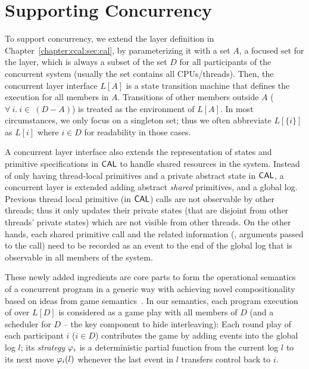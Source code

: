 \section{Supporting Concurrency}
\label{chapter:ccal:sec:ccal-overview}


To support concurrency, 
we extend the layer definition in Chapter~\ref{chapter:ccal:sec:cal},
by parameterizing it with a set $A$, 
a focused set for the layer, which is always a subset of the set $D$ for all participants of the concurrent system (usually the set contains all CPUs/threads).
Then, the concurrent layer interface $L[A]$ is a state transition machine
that defines the execution for all members in $A$. 
Transitions of other members outside $A$  ($\forall \ i . \ i \in\ (D - A)$)
is treated as the environment of $L[A]$. 
In most circumstances, we only focus on a singleton set; 
thus we often abbreviate $L[\{i\}]$ as $L[i]$ where $i\in{}D$ for readability in those cases.

A concurrent layer interface also extends the representation of states and primitive specifications in $\mathsf{CAL}$ to handle shared resources in the system. 
Instead of only having thread-local primitives and a private abstract state in $\mathsf{CAL}$, 
a concurrent layer is extended adding abstract \textit{shared} primitives, 
and a global log. 
Previous thread local primitive (in $\mathsf{CAL}$) calls are not observable by other threads; thus it only updates their private states (that are disjoint from other threads' private states) which are not visible from other threads. 
On the other hands, each shared primitive call and the related information (\ie, arguments passed to the call) 
need to be recorded as an event to the end of the global log that
is observable in all members of the system.

These newly added ingredients are core parts to form the operational semantics of a concurrent program 
 in a generic way with achieving novel compositionality based on
ideas from game semantics~\cite{gsinvite}. 
In our semantics, 
each program execution of  over 
$L[D]$ is considered as a game play with all members of $D$ 
(and a scheduler for $D$ -- the key component to hide interleaving):
Each round play of each participant $i$ ($i\in{}D$) contributes the game 
by adding events into the global log $l$; its {\em strategy}
$\varphi_{i}$ is a deterministic partial function from
the current log $l$ to its next move $\varphi_{i}(l)$ whenever
the last event in $l$ transfers control back to $i$. 

